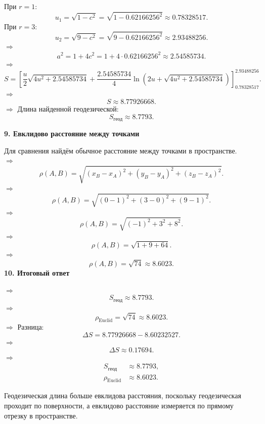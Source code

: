 \documentclass[12pt,a4paper]{article}
\begin{document}
При \(r=1\):
\[
u_1=\sqrt{1-c^2}=\sqrt{1-0.62166256^2}\approx0.78328517.
\]
При \(r=3\):
\[
u_2=\sqrt{9-c^2}=\sqrt{9-0.62166256^2}\approx2.93488256.
\]
\(\Rightarrow\)
\[
a^2=1+4c^2=1+4\cdot0.62166256^2\approx2.54585734.
\]
\(\Rightarrow\)
\[
S=\left[\frac{u}{2}\sqrt{4u^2+2.54585734}+\frac{2.54585734}{4}\ln\left(2u+\sqrt{4u^2+2.54585734}\right)\right]_{0.78328517}^{2.93488256}.
\]
\(\Rightarrow\)
\[
\boxed{S\approx8.77926668.}
\]
\(\Rightarrow\) Длина найденной геодезической:
\[
\boxed{S_{\text{геод}}\approx8.7793.}
\]

\textbf{9. Евклидово расстояние между точками}

Для сравнения найдём обычное расстояние между точками в пространстве.\\
\(\Rightarrow\)
\[
\rho(A,B)=\sqrt{(x_B-x_A)^2+(y_B-y_A)^2+(z_B-z_A)^2}.
\]
\(\Rightarrow\)
\[
\rho(A,B)=\sqrt{(0-1)^2+(3-0)^2+(9-1)^2}.
\]
\(\Rightarrow\)
\[
\rho(A,B)=\sqrt{(-1)^2+3^2+8^2}.
\]
\(\Rightarrow\)
\[
\rho(A,B)=\sqrt{1+9+64}.
\]
\(\Rightarrow\)
\[
\boxed{\rho(A,B)=\sqrt{74}\approx8.6023.}
\]
\newpage
\textbf{10. Итоговый ответ}

\(\Rightarrow\)
\[
S_{\text{геод}}\approx8.7793.
\]
\(\Rightarrow\)
\[
\rho_{\text{Euclid}}=\sqrt{74}\approx8.6023.
\]
\(\Rightarrow\) Разница:
\[
\Delta S=8.77926668-8.60232527.
\]
\(\Rightarrow\)
\[
\boxed{\Delta S\approx0.17694.}
\]
\(\Rightarrow\)
\[
\boxed{\begin{aligned} S_{\text{геод}}&\approx8.7793,\\ \rho_{\text{Euclid}}&\approx8.6023. \end{aligned}}
\]

Геодезическая длина больше евклидова расстояния, поскольку геодезическая проходит по поверхности, а евклидово расстояние измеряется по прямому отрезку в пространстве.
\end{document}
